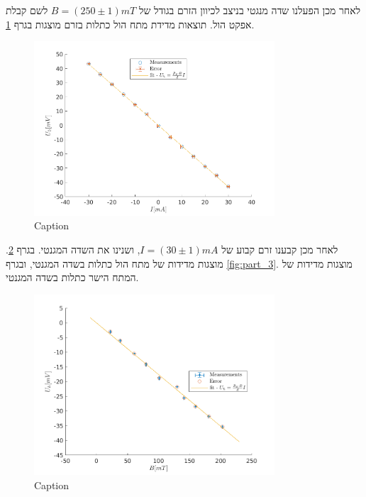 \documentclass{article}
\begin{document}
לאחר מכן הפעלנו שדה מנגטי בניצב לכיוון הזרם בגודל של 
$B = (250 \pm 1) mT$ 
לשם קבלת אפקט הול. תוצאות מדידת מתח הול כתלות בזרם מוצגות בגרף
\ref{fig:part_1}.

\begin{figure}[ht!]
    \centering
    \includegraphics[width=0.8\textwidth]{part1 - R_h.png}
    \caption{Caption}
    \label{fig:part_1}
\end{figure}
לאחר מכן קבענו זרם קבוע של
$I = (30 \pm 1) mA$,
ושנינו את השדה המגנטי.
בגרף
\ref{fig:part_2}.
מוצגות מדידות של מתח הול כתלות בשדה המגנטי,
ובגרף
\ref{fig:part_3}.
מוצגות מדידות של המתח הישר כתלות בשדה המגנטי.

\begin{figure}[ht!]
    \centering
    \includegraphics[width=0.8\textwidth]{part2 - R_h.png}
    \caption{Caption}
    \label{fig:part_2}
\end{figure}
\end{document}
